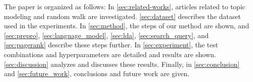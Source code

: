 The paper is organized as follows:
In \autoref{sec:related-works}, articles related to topic modeling and random walk are investigated.
\autoref{sec:dataset} describes the dataset used in the experiments.
In \autoref{sec:method}, the steps of our method are shown, and \autoref{sec:prepro}, \autoref{sec:language_model}, \autoref{sec:lda}, \autoref{sec:search_query}, and \autoref{sec:pagerank} describe these steps further.
In \autoref{sec:experiment}, the test combinations and hyperparameters are detailed and results are shown.
\autoref{sec:discussion} analyzes and discusses these results.
Finally, in \autoref{sec:conclusion} and \autoref{sec:future_work}, conclusions and future work are given.